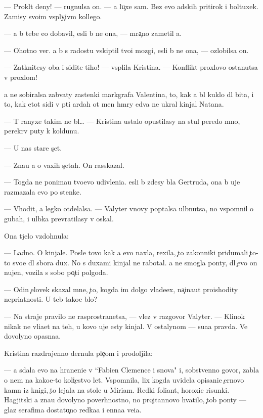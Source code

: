 \documentclass[10pt]{book}
\begin{document}
— Prokl{\ia}t{\yi}{\y} deny! — rugnulsa on. — {\Y}a lu{\c}xe sam. Bez {\y}evo adskih pritirok i boltuxek. Za{\y}misy svo{\y}im vsp{\yi}ly{\c}iv{\yi}m kollego{\y}.

— {\Y}a b{\yi} tebe {\y}e{\x}o dobavil, {\y}esli b{\yi} ne ona, — mra{\c}no zametil {\y}a.

— Ohotno ver{\iu}. {\Y}a b{\yi} s radost{\y}u vskip{\ia}til tvo{\y}i mozgi, {\y}esli b{\yi} ne ona, — ozlobilsa on.

— Zatknitesy oba i sidite tiho! — vsp{\yi}lila Kristina. — Konflikt{\yi} proxlovo ostanutsa v proxlom!

{\Y}a ne sobiralsa zab{\yi}vaty zastenki markgrafa Valentina, to, kak {\y}a b{\yi}l kuklo{\y} dl{\ia} bit{\y}a, i to, kak etot sid{\ia}{\x}i{\y} v p{\ia}ti {\y}ardah ot men{\ia} hm{\yi}ry {\y}edva ne ukral kinjal Natana.

— T{\yi} ranyxe takim ne b{\yi}l… — Kristina ustalo opustilasy na stul peredo mno{\y}, perekr{\yi}v puty k koldunu.

— U nas star{\yi}{\y}e s{\c}et{\yi}.

— Zna{\y}u {\y}a o vaxih s{\c}etah. On rasskazal.

— Togda ne ponima{\y}u tvo{\y}evo udivleni{\y}a. {\Y}esli b{\yi} zdesy b{\yi}la Gertruda, ona b{\yi} uje razmazala {\y}evo po stenke.

— V{\yi}hodit, {\y}a legko otdelalsa. — Valyter vnovy pop{\yi}talsa ul{\yi}bnutsa, no vspomnil o gubah, i ul{\yi}bka prevratilasy v oskal.

Ona t{\ia}jelo vzdohnula:

— Ladno. O kinjale. Posle tovo kak {\y}a {\y}evo naxla, rexila, {\c}to zakonniki pridumali {\c}to-to svo{\y}e dl{\ia} sbora dux. No s duxami kinjal ne rabotal. {\Y}a ne smogla pon{\ia}ty, dl{\ia} {\c}evo on nujen, vozila s sobo{\y} po{\c}ti polgoda.

— Odin {\c}elovek skazal mne, {\c}to, kogda im dolgo vlade{\y}ex, na{\c}ina{\y}ut pro{\y}ishodity nepri{\y}atnosti. U teb{\ia} tako{\y}e b{\yi}lo?

— Na straje{\y} pravilo ne rasprostran{\ia}{\y}etsa, — vlez v razgovor Valyter. — Klinok nikak ne vli{\y}a{\y}et na teh, u kovo uje {\y}esty kinjal{\yi}. V ostalynom — su{\x}a{\y}a pravda. Ve{\x} dovolyno opasna{\y}a.

Kristina razdrajenno dernula ple{\c}om i prodoljila:

— {\Y}a sdala {\y}evo na hraneni{\y}e v ``Fabien Clemence i s{\yi}nov{\y}a" i, sobstvenno govor{\ia}, zab{\yi}la o nem na kako{\y}e-to koli{\c}estvo let. Vspomnila, lix kogda uvidela opisani{\y}e {\c}ernovo kamn{\ia} iz knigi, {\c}to lejala na stole u Miriam. Redki{\y} foliant, horoxi{\y}e risunki. Hagjitski{\y} {\y}a zna{\y}u dovolyno poverhnostno, no pro{\c}itannovo hvatilo, {\c}tob{\yi} pon{\ia}ty — glaz serafima dostato{\c}no redka{\y}a i {\q}enna{\y}a ve{\x}i{\q}a.
\end{document}
